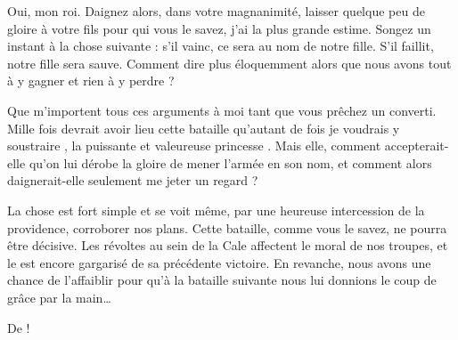 \begin{drama}
  \reinespeaks Oui, mon roi.
  Daignez alors, dans votre magnanimité, laisser quelque peu de gloire à votre fils \elena{} pour qui vous le savez, j’ai la plus grande estime. Songez un instant à la chose suivante : s’il vainc, ce sera au nom de notre fille. S’il faillit, notre fille sera sauve. Comment dire plus éloquemment alors que nous avons tout à y gagner et rien à y perdre ?

  \roispeaks Que m’importent tous ces arguments à moi tant que vous prêchez un converti. Mille fois devrait avoir lieu cette bataille qu’autant de fois je voudrais y soustraire \princesse, la puissante et valeureuse princesse \princesse. Mais elle, comment accepterait-elle qu’on lui dérobe la gloire de mener l’armée en son nom, et comment alors daignerait-elle seulement me jeter un regard ?

  \reinespeaks La chose est fort simple et se voit même, par une heureuse intercession de la providence, corroborer nos plans. Cette bataille, comme vous le savez, ne pourra être décisive. Les révoltes au sein de la Cale affectent le moral de nos troupes, et le \campoppose{} est encore gargarisé de sa précédente victoire. En revanche, nous avons une chance de l’affaiblir pour qu’à la bataille suivante nous lui donnions le coup de grâce par la main…

  \roispeaks De \princesse !
\end{drama}

\scene




\nopagebreak

